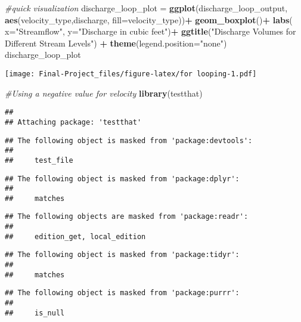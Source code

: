 \documentclass[
]{article}
\newenvironment{Shaded}{\begin{snugshade}}{\end{snugshade}}
\newcommand{\AttributeTok}[1]{\textcolor[rgb]{0.13,0.29,0.53}{#1}}
\newcommand{\CommentTok}[1]{\textcolor[rgb]{0.56,0.35,0.01}{\textit{#1}}}
\newcommand{\FunctionTok}[1]{\textcolor[rgb]{0.13,0.29,0.53}{\textbf{#1}}}
\newcommand{\NormalTok}[1]{#1}
\newcommand{\OtherTok}[1]{\textcolor[rgb]{0.56,0.35,0.01}{#1}}
\newcommand{\SpecialCharTok}[1]{\textcolor[rgb]{0.81,0.36,0.00}{\textbf{#1}}}
\newcommand{\StringTok}[1]{\textcolor[rgb]{0.31,0.60,0.02}{#1}}
\begin{document}
\begin{Shaded}
\begin{Highlighting}[]
\CommentTok{\#quick visualization}
\NormalTok{discharge\_loop\_plot }\OtherTok{=} \FunctionTok{ggplot}\NormalTok{(discharge\_loop\_output, }\FunctionTok{aes}\NormalTok{(velocity\_type,discharge, }\AttributeTok{fill=}\NormalTok{velocity\_type))}\SpecialCharTok{+}
  \FunctionTok{geom\_boxplot}\NormalTok{()}\SpecialCharTok{+}
  \FunctionTok{labs}\NormalTok{( }\AttributeTok{x=}\StringTok{"Streamflow"}\NormalTok{, }\AttributeTok{y=}\StringTok{"Discharge in cubic feet"}\NormalTok{)}\SpecialCharTok{+}
  \FunctionTok{ggtitle}\NormalTok{(}\StringTok{"Discharge Volumes for Different Stream Levels"}\NormalTok{) }\SpecialCharTok{+}
  \FunctionTok{theme}\NormalTok{(}\AttributeTok{legend.position=}\StringTok{"none"}\NormalTok{)}
\NormalTok{discharge\_loop\_plot}
\end{Highlighting}
\end{Shaded}

\texttt{[image: Final-Project\_files/figure-latex/for looping-1.pdf]}

\begin{Shaded}
\begin{Highlighting}[]
\CommentTok{\#Using a negative value for velocity}
\FunctionTok{library}\NormalTok{(testthat)}
\end{Highlighting}
\end{Shaded}

\begin{verbatim}
## 
## Attaching package: 'testthat'
\end{verbatim}

\begin{verbatim}
## The following object is masked from 'package:devtools':
## 
##     test_file
\end{verbatim}

\begin{verbatim}
## The following object is masked from 'package:dplyr':
## 
##     matches
\end{verbatim}

\begin{verbatim}
## The following objects are masked from 'package:readr':
## 
##     edition_get, local_edition
\end{verbatim}

\begin{verbatim}
## The following object is masked from 'package:tidyr':
## 
##     matches
\end{verbatim}

\begin{verbatim}
## The following object is masked from 'package:purrr':
## 
##     is_null
\end{verbatim}
\end{document}
